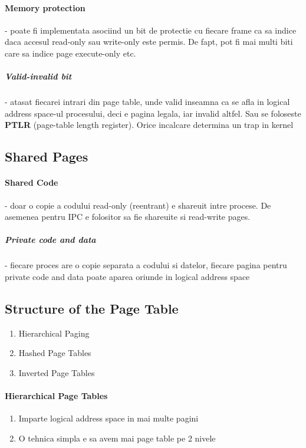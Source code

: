 \documentclass{article}
\begin{document}
\paragraph*{Memory protection} - poate fi implementata asociind un bit de protectie cu fiecare frame ca sa indice daca accesul read-only sau write-only este permis. De fapt, pot fi mai multi biti care sa indice page execute-only etc.
\subparagraph*{Valid-invalid bit} - atasat fiecarei intrari din page table, unde valid inseamna ca se afla in logical address space-ul procesului, deci e pagina legala, iar invalid altfel. Sau se foloseste \textbf{PTLR} (page-table length register). Orice incalcare determina un trap in kernel

\subsection*{Shared Pages}
\paragraph*{Shared Code} - doar o copie a codului read-only (reentrant) e shareuit intre procese. De asemenea pentru IPC e folositor sa fie shareuite si read-write pages.
\subparagraph*{Private code and data} - fiecare proces are o copie separata a codului si datelor, fiecare pagina pentru private code and data poate aparea oriunde in logical address space

\subsection*{Structure of the Page Table}
\begin{enumerate}
    \item Hierarchical Paging
    \item Hashed Page Tables
    \item Inverted Page Tables
\end{enumerate}

\paragraph*{Hierarchical Page Tables}
\begin{enumerate}
    \item Imparte logical address space in mai multe pagini
    \item O tehnica simpla e sa avem mai page table pe 2 nivele
\end{enumerate}
\end{document}
